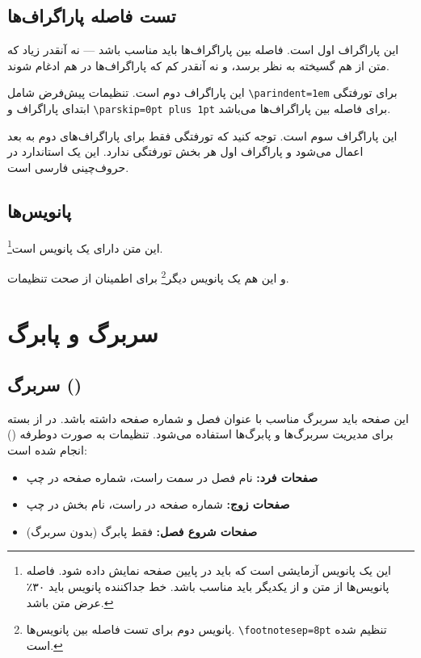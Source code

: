\documentclass{matinbook}
\begin{document}
\section{تست فاصله پاراگراف‌ها}

این پاراگراف اول است. فاصله بین پاراگراف‌ها باید مناسب باشد
--- نه آنقدر زیاد که متن از هم گسیخته به نظر برسد،
و نه آنقدر کم که پاراگراف‌ها در هم ادغام شوند.

این پاراگراف دوم است. تنظیمات پیش‌فرض  شامل
\texttt{\textbackslash parindent=1em} برای تورفتگی ابتدای پاراگراف
و \texttt{\textbackslash parskip=0pt plus 1pt} برای فاصله بین
پاراگراف‌ها می‌باشد.

این پاراگراف سوم است. توجه کنید که تورفتگی فقط برای پاراگراف‌های
دوم به بعد اعمال می‌شود و پاراگراف اول هر بخش تورفتگی ندارد.
این یک استاندارد در حروف‌چینی فارسی است.

\section{پانویس‌ها}

این متن دارای یک پانویس است\footnote{این یک پانویس آزمایشی است
که باید در پایین صفحه نمایش داده شود. فاصله پانویس‌ها از متن
و از یکدیگر باید مناسب باشد. خط جداکننده پانویس باید ۳۰٪
عرض متن باشد.}.

و این هم یک پانویس دیگر\footnote{پانویس دوم برای تست فاصله
بین پانویس‌ها. \texttt{\textbackslash footnotesep=8pt}
تنظیم شده است.} برای اطمینان از صحت تنظیمات.

\chapter{سربرگ و پابرگ}

\section{سربرگ ()}

این صفحه باید سربرگ مناسب با عنوان فصل و شماره صفحه داشته باشد.
در  از بسته  برای مدیریت سربرگ‌ها
و پابرگ‌ها استفاده می‌شود. تنظیمات به صورت دوطرفه ()
انجام شده است:

\begin{itemize}
    \item \textbf{صفحات فرد:} نام فصل در سمت راست، شماره صفحه در چپ
    \item \textbf{صفحات زوج:} شماره صفحه در راست، نام بخش در چپ
    \item \textbf{صفحات شروع فصل:} فقط پابرگ (بدون سربرگ)
\end{itemize}
\end{document}
